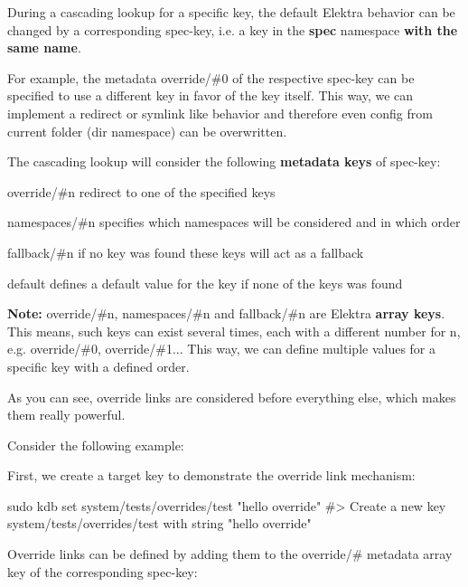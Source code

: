 During a cascading lookup for a specific key, the default Elektra behavior can be changed by a corresponding {\ttfamily spec-\/key}, i.\+e. a key in the {\bfseries spec} namespace {\bfseries with the same name}.

For example, the metadata {\ttfamily override/\#0} of the respective {\ttfamily spec-\/key} can be specified to use a different key in favor of the key itself. This way, we can implement a redirect or symlink like behavior and therefore even config from current folder ({\ttfamily dir} namespace) can be overwritten.

The cascading lookup will consider the following {\bfseries metadata keys} of {\ttfamily spec-\/key}\+:


\begin{DoxyEnumerate}
\item {\ttfamily override/\#n} redirect to one of the specified keys
\item {\ttfamily namespaces/\#n} specifies which namespaces will be considered and in which order
\item {\ttfamily fallback/\#n} if no key was found these keys will act as a fallback
\item {\ttfamily default} defines a default value for the key if none of the keys was found
\end{DoxyEnumerate}

{\bfseries Note\+:} {\ttfamily override/\#n}, {\ttfamily namespaces/\#n} and {\ttfamily fallback/\#n} are Elektra {\bfseries array keys}. This means, such keys can exist several times, each with a different number for {\ttfamily n}, e.\+g. {\ttfamily override/\#0}, {\ttfamily override/\#1}... This way, we can define multiple values for a specific key with a defined order.

As you can see, override links are considered before everything else, which makes them really powerful.

Consider the following example\+:

First, we create a target key to demonstrate the override link mechanism\+:


\begin{DoxyCode}
sudo kdb set system/tests/overrides/test "hello override"
#> Create a new key system/tests/overrides/test with string "hello override"
\end{DoxyCode}


Override links can be defined by adding them to the {\ttfamily override/\#} metadata array key of the corresponding {\ttfamily spec-\/key}\+:


